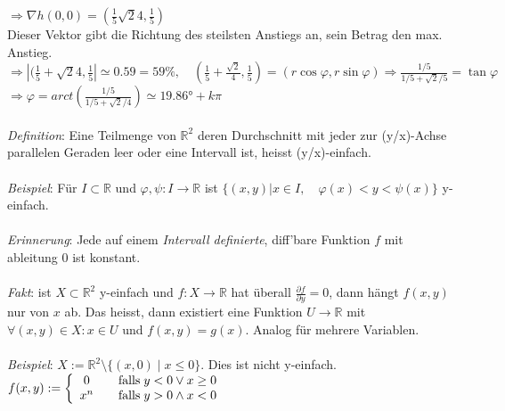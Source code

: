 \documentclass[12pt,a4paper,titlepage]{article}
\renewcommand{\d}{\partial}
\newcommand{\setR}{\mathbb{R}}
\begin{document}
$\Rightarrow \nabla h(0,0)=(\frac{1}{5}{\sqrt{2}}{4},\frac{1}{5})\quad$ \\
Dieser Vektor gibt die Richtung des steilsten Anstiegs an, sein Betrag den max. Anstieg. \\
$\Rightarrow |(\frac{1}{5}+{\sqrt{2}}{4},\frac{1}{5}|\simeq 0.59=59\%,\quad (\frac{1}{5}+\frac{\sqrt{2}}{4},\frac{1}{5})=(r\cos\varphi,r\sin\varphi)\Rightarrow \frac{1/5}{1/5+\sqrt{2}/5}=\tan\varphi $ \\
$\Rightarrow \varphi=arct(\frac{1/5}{1/5+\sqrt{2}/4})\simeq 19.86\text{°}+k\pi$ \\
\\
\textit{Definition}: Eine Teilmenge von $\setR^2$ deren Durchschnitt mit jeder zur (y/x)-Achse parallelen Geraden leer oder eine Intervall ist, heisst (y/x)-einfach. \\
\\
\textit{Beispiel}: Für $I\subset\setR$ und $\varphi,\psi:I\to\setR$ ist $\{(x,y)|x\in I,\quad \varphi(x)<y<\psi(x)\}$ y-einfach. \\
\\
\textit{Erinnerung}: Jede auf einem \emph{Intervall definierte}, diff'bare Funktion $f$ mit ableitung $0$ ist konstant. \\
\\
\textit{Fakt}: ist $X\subset\setR^2$ y-einfach und $f:X\to\setR$ hat überall $\frac{\d f}{\d y}=0$, dann hängt $f(x,y)$ nur von $x$ ab. Das heisst, dann existiert eine Funktion $U\to\setR$ mit $\forall(x,y)\in X:x\in U$ und $f(x,y)=g(x)$. Analog für mehrere Variablen. \\
\\
\textit{Beispiel}: $X:=\setR^2\setminus\{(x,0)\mid x\leq 0\}$. Dies ist nicht y-einfach. \\
$f(x,y):=\left\{\begin{array}{c l}
    0 & \quad\text{falls}\; y<0\lor x\geq0 \\
    x^n & \quad\text{falls}\; y>0\land x<0
  \end{array}\right.$ 
\end{document}
